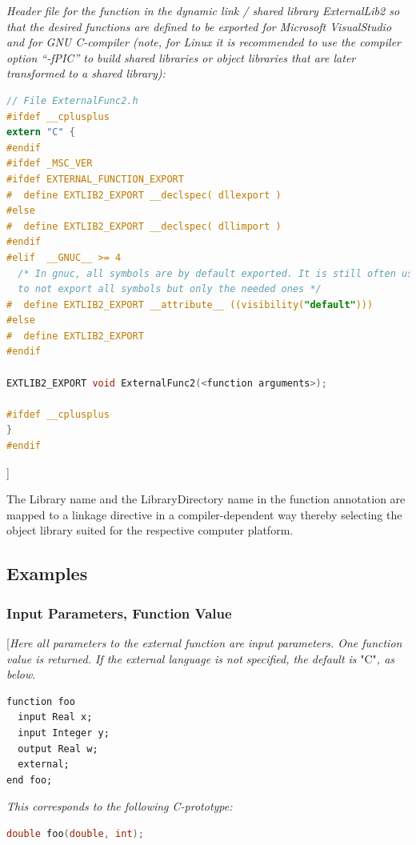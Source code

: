 \documentclass[10pt,a4paper]{report}
\def\doublelabel#1{\label{#1}\hypertarget{#1}{}}
\begin{document}
\emph{Header file for the function in the dynamic link / shared library
ExternalLib2 so that the desired functions are defined to be exported
for Microsoft VisualStudio and for GNU C-compiler (note, for Linux it is
recommended to use the compiler option ``-fPIC'' to build shared
libraries or object libraries that are later transformed to a shared
library):}

\begin{lstlisting}[language=C]
// File ExternalFunc2.h 
#ifdef __cplusplus 
extern "C" { 
#endif 
#ifdef _MSC_VER 
#ifdef EXTERNAL_FUNCTION_EXPORT 
#  define EXTLIB2_EXPORT __declspec( dllexport ) 
#else  
#  define EXTLIB2_EXPORT __declspec( dllimport ) 
#endif 
#elif  __GNUC__ >= 4     
  /* In gnuc, all symbols are by default exported. It is still often useful,         
  to not export all symbols but only the needed ones */ 
#  define EXTLIB2_EXPORT __attribute__ ((visibility("default"))) 
#else 
#  define EXTLIB2_EXPORT 
#endif

EXTLIB2_EXPORT void ExternalFunc2(<function arguments>); 

#ifdef __cplusplus 
} 
#endif
\end{lstlisting}
{]}

The Library name and the LibraryDirectory name in the function
annotation are mapped to a linkage directive in a compiler-dependent way
thereby selecting the object library suited for the respective computer
platform.

\subsection{Examples}\doublelabel{examples1}

\subsubsection{Input Parameters, Function Value}\doublelabel{input-parameters-function-value}

{[}\emph{Here all parameters to the external function are input
parameters. One function value is returned. If the external language is
not specified, the default is} "C"\emph{, as below}.

\begin{lstlisting}[language=modelica]
function foo
  input Real x;
  input Integer y;
  output Real w;
  external;
end foo;
\end{lstlisting}
\emph{This corresponds to the following C-prototype:}
\begin{lstlisting}[language=C]
double foo(double, int);
\end{lstlisting}
\end{document}
